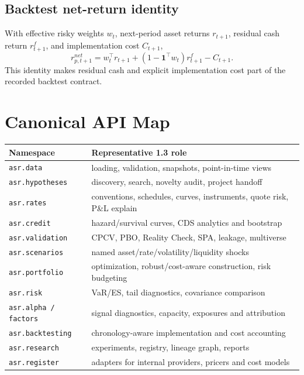 \documentclass{asrpaper}
\begin{document}
\subsection{Backtest net-return identity}
With effective risky weights $w_t$, next-period asset returns $r_{t+1}$, residual cash return $r^f_{t+1}$, and implementation cost $C_{t+1}$,
\begin{equation}
r^{net}_{p,t+1}=w_t^\top r_{t+1}+\left(1-\mathbf{1}^\top w_t\right)r^f_{t+1}-C_{t+1}.
\end{equation}
This identity makes residual cash and explicit implementation cost part of the recorded backtest contract.

\section{Canonical API Map}
\begin{center}\fontsize{8.3}{9.7}\selectfont
\begin{tabularx}{\linewidth}{@{}p{.29\linewidth}X@{}}
\toprule
\textbf{Namespace} & \textbf{Representative 1.3 role}\\
\midrule
\texttt{asr.data} & loading, validation, snapshots, point-in-time views\\
\texttt{asr.hypotheses} & discovery, search, novelty audit, project handoff\\
\texttt{asr.rates} & conventions, schedules, curves, instruments, quote risk, P\&L explain\\
\texttt{asr.credit} & hazard/survival curves, CDS analytics and bootstrap\\
\texttt{asr.validation} & CPCV, PBO, Reality Check, SPA, leakage, multiverse\\
\texttt{asr.scenarios} & named asset/rate/volatility/liquidity shocks\\
\texttt{asr.portfolio} & optimization, robust/cost-aware construction, risk budgeting\\
\texttt{asr.risk} & VaR/ES, tail diagnostics, covariance comparison\\
\texttt{asr.alpha / factors} & signal diagnostics, capacity, exposures and attribution\\
\texttt{asr.backtesting} & chronology-aware implementation and cost accounting\\
\texttt{asr.research} & experiments, registry, lineage graph, reports\\
\texttt{asr.register} & adapters for internal providers, pricers and cost models\\
\bottomrule
\end{tabularx}\end{center}
\end{document}
